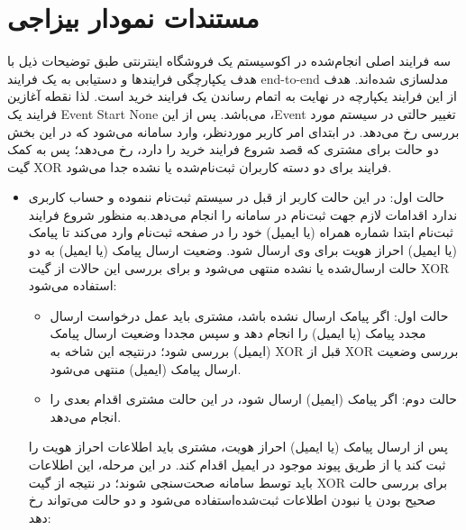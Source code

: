 \documentclass[14pt]{article}
\begin{document}
\section{مستندات نمودار بیزاجی}

سه فرایند اصلی انجام‌شده در اکوسیستم یک فروشگاه اینترنتی طبق توضیحات ذیل با هدف یکپارچگی فرایندها و دستیابی به یک فرایند end-to-end مدلسازی شده‌اند. هدف از این فرایند یکپارچه در نهایت به اتمام رساندن یک فرایند خرید است. لذا نقطه آغازین فرایند یک Event Start None می‌باشد. پس از این ،Event تغییر حالتی در سیستم مورد بررسی رخ می‌دهد. در ابتدای امر کاربر موردنظر، وارد سامانه می‌شود که در این بخش دو حالت برای مشتری که قصد شروع فرایند خرید را دارد، رخ می‌دهد؛  پس به کمک گیت
 XOR فرایند برای دو دسته کاربران ثبت‌نام‌شده یا نشده جدا می‌شود.

\begin{flushright}
\begin{itemize}
\item حالت اول: در این حالت کاربر از قبل در سیستم ثبت‌نام ننموده و حساب کاربری ندارد اقدامات لازم جهت ثبت‌نام در سامانه را انجام می‌دهد.به منظور شروع فرایند ثبت‌نام ابتدا شماره همراه (یا ایمیل) خود را در صفحه ثبت‌نام وارد می‌کند تا پیامک (یا ایمیل) احراز هویت برای وی ارسال شود. وضعیت ارسال پیامک (یا ایمیل) به  دو حالت ارسال‌شده یا نشده منتهی می‌شود و برای بررسی این حالات از گیت XOR استفاده می‌شود:
\begin{flushright}
\begin{itemize}
\item حالت اول: اگر پیامک ارسال نشده باشد، مشتری باید عمل درخواست ارسال مجدد پیامک (یا ایمیل) را انجام دهد و سپس مجددا وضعیت ارسال پیامک (ایمیل) بررسی شود؛ درنتیجه این شاخه به XOR قبل از XOR بررسی وضعیت ارسال پیامک (ایمیل) منتهی می‌شود.
\item حالت دوم: اگر پیامک (ایمیل) ارسال شود، در این حالت مشتری اقدام بعدی را انجام می‌دهد.
\end{itemize}
\end{flushright}

پس از ارسال پیامک (یا ایمیل) احراز هویت، مشتری باید اطلاعات احراز هویت را ثبت کند یا از طریق پیوند موجود در ایمیل اقدام کند. در این مرحله، این اطلاعات باید توسط سامانه صحت‌سنجی شوند؛ در نتیجه از گیت XOR برای بررسی حالت صحیح بودن یا نبودن اطلاعات ثبت‌شده‌استفاده می‌شود و دو حالت می‌تواند رخ دهد:


\end{itemize}
\end{flushright}
\end{document}

